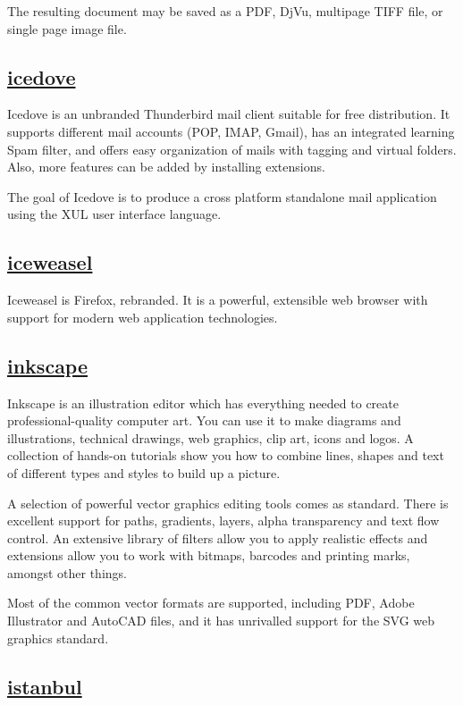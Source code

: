  The resulting document may be saved as a PDF, DjVu, multipage TIFF file, or
 single page image file.

\subsection{\href{http://www.mozilla.org/thunderbird/}{icedove}}

 Icedove is an unbranded Thunderbird mail client suitable for free
 distribution. It supports different mail accounts (POP, IMAP, Gmail), has an
 integrated learning Spam filter, and offers easy organization of mails with
 tagging and virtual folders. Also, more features can be added by installing
 extensions.
 
 The goal of Icedove is to produce a cross platform standalone mail application
 using the XUL user interface language.

\subsection{\href{}{iceweasel}}

 Iceweasel is Firefox, rebranded. It is a powerful, extensible web browser
 with support for modern web application technologies.

\subsection{\href{http://www.inkscape.org/}{inkscape}}

 Inkscape is an illustration editor which has everything needed to
 create professional-quality computer art. You can use it to make
 diagrams and illustrations, technical drawings, web graphics, clip art,
 icons and logos. A collection of hands-on tutorials show you how to
 combine lines, shapes and text of different types and styles to build
 up a picture.
 
 A selection of powerful vector graphics editing tools comes as
 standard. There is excellent support for paths, gradients, layers,
 alpha transparency and text flow control. An extensive library of
 filters allow you to apply realistic effects and extensions allow you
 to work with bitmaps, barcodes and printing marks, amongst other things.
 
 Most of the common vector formats are supported, including PDF, Adobe
 Illustrator and AutoCAD files, and it has unrivalled support for the
 SVG web graphics standard.

\subsection{\href{http://live.gnome.org/Istanbul}{istanbul}}

